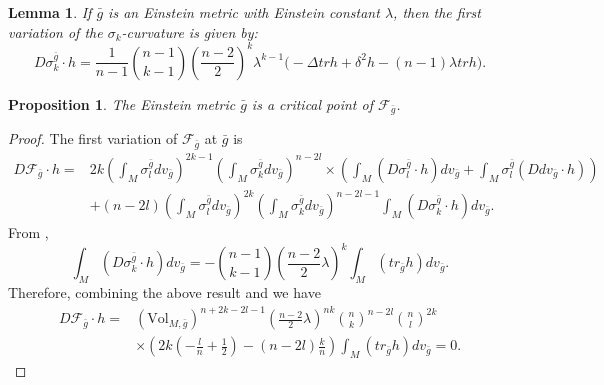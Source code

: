 \documentclass[10pt,a4paper]{amsart}
\newtheorem{lemma}{Lemma}
\newtheorem{proposition}{Proposition}
\newcommand{\bg}{\bar{g}}
\begin{document}
\begin{lemma}\label{Lemma: 1st_variation_of_sigma}
    If $\bg$ is an Einstein metric with Einstein constant $\lambda$, then the first variation of the $\sigma_k$-curvature is given by:
    \begin{equation*}
        D\sigma_k^{\bg}\cdot h=\frac{1}{n-1}\binom{n-1}{k-1}\left(\frac{n-2}{2}\right)^k\lambda^{k-1}\big(-\Delta trh+\delta^2h-(n-1)\lambda trh\big).
    \end{equation*}
\end{lemma}

\begin{proposition}\label{Proposition: critical_pts}
The Einstein metric $\bg$ is a critical point of  $\mathcal{F}_{\bg}$.
\end{proposition}

\begin{proof}
    The first variation of $\mathcal{F}_{\bg}$ at $\bg$ is
    \begin{equation*}
    \begin{split}
        D\mathcal{F}_{\bg}\cdot h=
        &2k \left( \int_M \sigma_l^{\bg} dv_{\bg} \right)^{2k-1} \left(\int_M \sigma_k^{\bg} dv_{\bg} \right)^{n-2l} \times \left(\int_M(D\sigma_l^{\bg}\cdot h) dv_{\bg}+\int_M\sigma_l^{\bg} (Ddv_{\bg}\cdot h)\right)\\
        &+ \left(n-2l\right) \left(\int_M \sigma_l^{\bg}dv_{\bg}\right)^{2k} \left(\int_M \sigma_k^{\bg}dv_{\bg}\right)^{n-2l-1}\int_M \left( D\sigma_k^{\bg}\cdot h \right)dv_{\bg}.
    \end{split}
    \end{equation*}
    From ,
    \begin{equation*}
        \int_M \left( D\sigma_k^{\bg}\cdot h \right)dv_{\bg} = -\binom{n-1}{k-1} \left(\frac{n-2}{2}\lambda\right)^k\int_M\left( tr_{\bg}h \right) dv_{\bg}.
    \end{equation*}
    Therefore, combining the above result and  we have
    \begin{equation*}
    \begin{split}
        D\mathcal{F}_{\bg}\cdot h=
        &\left(\mathrm{Vol}_{M,\bg}\right)^{n+2k-2l-1} \left(\frac{n-2}{2}\lambda \right)^{nk}\binom{n}{k}^{n-2l}\binom{n}{l}^{2k}\\
        &\times \left(2k\left(-\frac{l}{n}+\frac{1}{2}\right)-(n-2l)\frac{k}{n} \right) \int_M(tr_{\bg}h) dv_{\bg}=0.
    \end{split}
    \end{equation*}
\end{proof}
\end{document}
